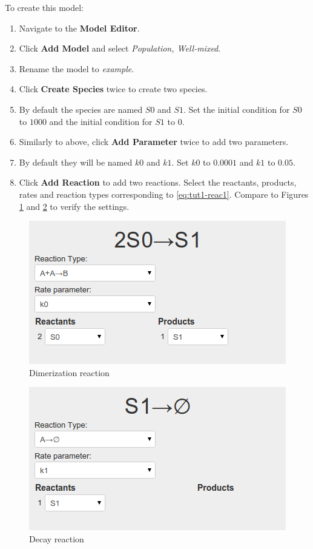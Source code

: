 To create this model:
\begin{enumerate}
  \item Navigate to the \textbf{Model Editor}.
  \item Click \textbf{Add Model} and select \textit{Population, Well-mixed}.
  \item Rename the model to \textit{example}.
  \item Click \textbf{Create Species} twice to create two species.
  \item By default the species are named $S0$ and $S1$. Set the initial condition for $S0$ to $1000$ and the initial condition for $S1$ to $0$.
  \item Similarly to above, click \textbf{Add Parameter} twice to add two parameters.
  \item By default they will be named $k0$ and $k1$. Set $k0$ to $0.0001$ and $k1$ to $0.05$.
  \item Click \textbf{Add Reaction} to add two reactions. Select the reactants, products, rates and reaction types corresponding to \eqref{eq:tut1-reac1}. Compare to Figures \ref{fig:reaction2} and \ref{fig:reaction1} to verify the settings.
\end{enumerate}

\begin{figure}[!htb]
\centering
\includegraphics[scale=0.64]{T1/reaction2.png}
\caption{Dimerization reaction}
\label{fig:reaction2}
\end{figure}

\begin{figure}[!htb]
\centering
\includegraphics[scale=0.64]{T1/reaction1.png}
\caption{Decay reaction}
\label{fig:reaction1}
\end{figure}

